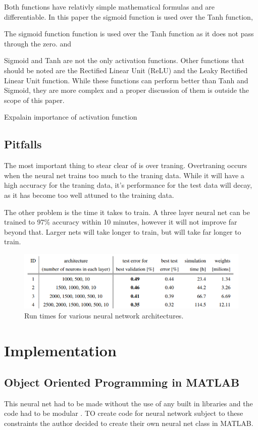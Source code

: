 \documentclass[12pt]{article}
\begin{document}
	Both functions have relativly simple mathematical formulas and are differentiable. In this paper the sigmoid function is used over the Tanh function, 
	
	The sigmoid function function is used over the Tanh function as it does not pass through the zero.  and 
	
	
	Sigmoid and Tanh are not the only activation functions. Other functions that should be noted are the Rectified Linear Unit (ReLU) and the Leaky Rectified Linear Unit function. While these functions can perform better than Tanh and Sigmoid, they are more complex and a proper discussion of them is outside the scope of this paper. 
	
	Expalain importance of activation function
	
	\subsection{Pitfalls}
	The most important thing to stear clear of is over traning. Overtraning occurs when the neural net trains too much to the traning data. While it will have a high accuracy for the traning data, it's performance for the test data will decay, as it has become too well attuned to the training data.  \par 
	
	The other problem is the time it takes to train. A three layer neural net can be trained to 97\% accuracy within 10 minutes, however it will not improve far beyond that. Larger nets will take longer to train, but will take far longer to train. 
	
	\begin{figure}
		\centering
		\includegraphics[width=0.7\linewidth]{nnRunTime}
		\caption{Run times for various neural network architectures\cite{deepBig}.}
		\label{fig:nnruntime}
	\end{figure}
	
	\section{Implementation}
	\subsection{Object Oriented Programming in MATLAB}
	This neural net had to be made without the use of any built in libraries \cite{Hicken18gradProjDes} and the code had to be modular \cite{Hicken18gradProjRubric}. TO create code for neural network subject to these constraints the author decided to create their own neural net class in MATLAB. \par 
	
\end{document}
